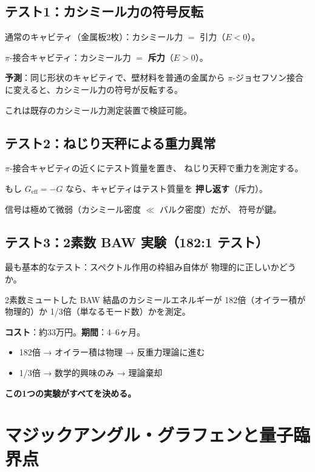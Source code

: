 \documentclass[11pt,a4paper]{article}
\begin{document}
\subsection{テスト1：カシミール力の符号反転}

通常のキャビティ（金属板2枚）：カシミール力 $= $ 引力（$E < 0$）。

$\pi$-接合キャビティ：カシミール力 $= $ \textbf{斥力}（$E > 0$）。

\textbf{予測}：同じ形状のキャビティで、壁材料を普通の金属から
$\pi$-ジョセフソン接合に変えると、カシミール力の符号が反転する。

これは既存のカシミール力測定装置で検証可能。

\subsection{テスト2：ねじり天秤による重力異常}

$\pi$-接合キャビティの近くにテスト質量を置き、
ねじり天秤で重力を測定する。

もし $G_{\mathrm{eff}} = -G$ なら、キャビティはテスト質量を
\textbf{押し返す}（斥力）。

信号は極めて微弱（カシミール密度 $\ll $ バルク密度）だが、
符号が鍵。

\subsection{テスト3：2素数 BAW 実験（182:1 テスト）}

最も基本的なテスト：スペクトル作用の枠組み自体が
物理的に正しいかどうか。

2素数ミュートした BAW 結晶のカシミールエネルギーが
182倍（オイラー積が物理的）か 1/3倍（単なるモード数）かを測定。

\textbf{コスト}：約33万円。\textbf{期間}：4--6ヶ月。

\begin{tcolorbox}[colback=yellow!5,colframe=yellow!50!black,title=判定基準]
\begin{itemize}
\item 182倍 → オイラー積は物理 → 反重力理論に進む
\item 1/3倍 → 数学的興味のみ → 理論棄却
\end{itemize}
\textbf{この1つの実験がすべてを決める。}
\end{tcolorbox}


\section{マジックアングル・グラフェンと量子臨界点}
\end{document}
